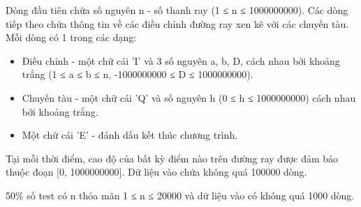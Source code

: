 Dòng đầu tiên chứa số nguyên n - số thanh ray (1 ≤ n ≤ 1000000000). Các dòng tiếp theo chứa thông tin về các điều   chỉnh đường ray xen kẽ với các chuyến tàu. Mỗi dòng có 1 trong các dạng:  
\begin{itemize}
	\item     Điều chỉnh - một chữ cái 'I' và 3 số nguyên a, b, D, cách nhau bởi khoảng trắng (1 ≤ a ≤ b ≤ n, -1000000000 ≤ D ≤   1000000000).   
	\item     Chuyến tàu - một chữ cái 'Q' và số nguyên h (0 ≤  h ≤ 1000000000) cách nhau bởi khoảng trắng.   
	\item     Một chữ cái 'E' - đánh dấu kết thúc chương trình.   
\end{itemize}

   Tại mỗi thời điểm, cao độ của bất kỳ điểm nào trên đường ray được đảm bảo thuộc đoạn [0, 1000000000]. Dữ liệu   vào chứa không quá 100000 dòng.  

   50\% số test có n thỏa mãn 1 ≤ n ≤ 20000 và dữ liệu vào có không quá 1000 dòng.  

\
